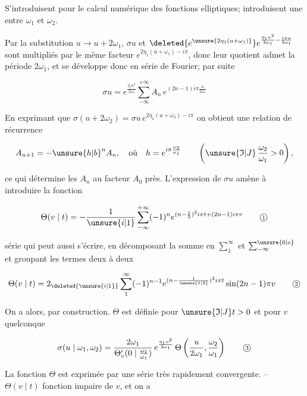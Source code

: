 S'introduisent pour le calcul numérique des fonctions elliptiques; introduisent une  entre $\omega_1$ et $\omega_2$.

Par la substitution $u\to u+2\omega_1$, $\sigma u$ et $\deleted{e^{\unsure{2\eta_1(u+\omega_1)}}}e^{\frac{\eta_1 u^2}{2\omega_1}-\frac{i\pi u}{2\omega_1}}$ sont multipliés par le même facteur $e^{2\eta_1(u+\omega_1)-i\pi}$, donc leur quotient admet la période $2\omega_1$, et se développe donc en série de Fourier; par suite

\[
\sigma u=e^{\frac{\eta_1u^2}{2\omega_1}}\sum_{-\infty}^{+\infty} A_n\,e^{(2n-1)i\pi\frac{u}{2\omega_1}}
\tag*{1}
\]

En exprimant que $\sigma(u+2\omega_2)=\sigma u\,e^{2\eta_2(u+\omega_2)-i\pi}$ on obtient une relation de récurrence

\[
A_{n+1}=-{\unsure{h|b}}^nA_n,\quad\text{où}\quad h=e^{i\pi\frac{\omega_2}{\omega_1}}
\qquad\left(\unsure{\mathfrak I|J}\,\frac{\omega_2}{\omega_1}>0\right),
\]

ce qui détermine les $A_n$  au facteur $A_0$ près. L'expression de $\sigma u$ amène à introduire la fonction

\[
\Theta(v\mid t)=-\frac{1}{\unsure{i|1}}\sum_{-\infty}^{+\infty}(-1)^n e^{(n-\frac12)^2i\pi t+(2n-1)i\pi v}
\tag*{\textcircled{\scriptsize 1}}
\]

série qui peut aussi s'écrire, en  décomposant la somme en $\sum_1^\infty$ et $\sum_{-\infty}^{\unsure{0|o}}$ et groupant les termes deux à deux

\[
\Theta(v\mid t)=2_{\deleted{\unsure{i|1}}}\sum_1^\infty(-1)^{n-1}e^{(n-\frac{1}{\unsure{1|2}})^2i\pi t}\sin(2n-1)\pi v
\tag*{\textcircled{\scriptsize 2}}
\]

On a alors, par construction. $\Theta$ est définie  pour $\unsure{\mathfrak I|J}t>0$ et pour $v$ quelconque

\[
\sigma(u\mid\omega_1,\omega_2)=
\frac{2\omega_1}{\Theta'_v(0\mid\frac{\omega_2}{\omega_1})}\,
e^{\frac{\eta_1u^2}{2\omega_1}}\,\Theta\left(\frac{u}{2\omega_1},\frac{\omega_2}{\omega_1}\right)
\tag*{\textcircled{\scriptsize 3}}
\]

La fonction $\Theta$ est exprimée par une série très rapidement convergente. -- $\Theta(v\mid t)$  fonction impaire de $v$, et on a

